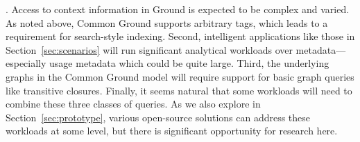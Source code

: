 \documentclass{sig-alternate}
\begin{document}



.  Access to context information in Ground is expected to be complex and varied. As noted above, Common Ground supports arbitrary tags, which leads to a requirement for search-style indexing.
Second, intelligent applications like those in Section~\ref{sec:scenarios} will run significant analytical workloads over metadata---especially usage metadata which could be quite large.  
Third, the underlying graphs in the Common Ground model will require support for basic graph queries like transitive closures. Finally, it seems natural that some workloads will need to combine these three classes of queries.
As we also explore in Section~\ref{sec:prototype}, various open-source solutions can address these workloads at some level, but there is significant opportunity for research here.
\end{document}
